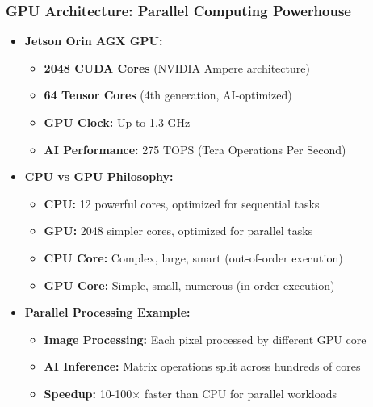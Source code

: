 \begin{frame}
\frametitle{GPU Architecture: Parallel Computing Powerhouse}
\begin{itemize}
    \item \textbf{Jetson Orin AGX GPU:}
    \begin{itemize}
        \item \textbf{2048 CUDA Cores} (NVIDIA Ampere architecture)
        \item \textbf{64 Tensor Cores} (4th generation, AI-optimized)
        \item \textbf{GPU Clock:} Up to 1.3 GHz
        \item \textbf{AI Performance:} 275 TOPS (Tera Operations Per Second)
    \end{itemize}
    \item \textbf{CPU vs GPU Philosophy:}
    \begin{itemize}
        \item \textbf{CPU:} 12 powerful cores, optimized for sequential tasks
        \item \textbf{GPU:} 2048 simpler cores, optimized for parallel tasks
        \item \textbf{CPU Core:} Complex, large, smart (out-of-order execution)
        \item \textbf{GPU Core:} Simple, small, numerous (in-order execution)
    \end{itemize}
    \item \textbf{Parallel Processing Example:}
    \begin{itemize}
        \item \textbf{Image Processing:} Each pixel processed by different GPU core
        \item \textbf{AI Inference:} Matrix operations split across hundreds of cores
        \item \textbf{Speedup:} 10-100× faster than CPU for parallel workloads
    \end{itemize}
\end{itemize}
\end{frame}

